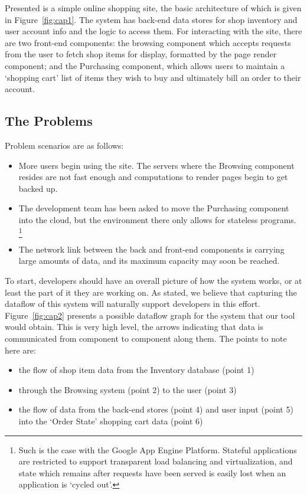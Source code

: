 \documentclass[msc,oneside]{ubcthesis}
\begin{document}
Presented is a simple online shopping site, the basic architecture of which is given in Figure~\ref{fig:cap1}. The system has back-end data stores for shop inventory and user account info and the logic to access them. For interacting with the site, there are two front-end components: the browsing component which accepts requests from the user to fetch shop items for display, formatted by the page render component; and the Purchasing component, which allows users to maintain a `shopping cart' list of items they wish to buy and ultimately bill an order to their account. 

\subsection{The Problems}

Problem scenarios are as follows:

\begin{itemize}
\item More users begin using the site. The servers where the Browsing component resides are not fast enough and computations to render pages begin to get backed up.
\item The development team has been asked to move the Purchasing component into the cloud, but the environment there only allows for stateless programs. \footnote{Such is the case with the Google App Engine Platform. Stateful applications are restricted to support transparent load balancing and virtualization, and state which remains after requests have been served is easily lost when an application is `cycled out'.}
\item The network link between the back and front-end components is carrying large amounts of data, and its maximum capacity may soon be reached.
\end{itemize}

To start, developers should have an overall picture of how the system works, or at least the part of it they are working on. As stated, we believe that capturing the dataflow of this system will naturally support developers in this effort. Figure~\ref{fig:cap2} presents a possible dataflow graph for the system that our tool would obtain. This is very high level, the arrows indicating that data is communicated from component to component along them. The points to note here are:\\

\begin{itemize}
\item the flow of shop item data from the Inventory database (point 1)
\item through the Browsing system (point 2) to the user (point 3)
\item the flow of data from the back-end stores (point 4) and user input (point 5) into the `Order State' shopping cart data (point 6)
\end{itemize}
\end{document}
